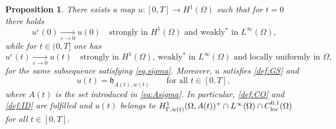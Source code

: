 \documentclass[a4paper,11pt,reqno]{amsart}
\numberwithin{equation}{section}
\newtheorem{prop}[teo]{Proposition}
\theoremstyle{definition}
\theoremstyle{remark}
\begin{document}
\begin{prop}\label{teo:convergence_ueps}
    There exists a map $u\colon[0,T]\to H^1(\Omega)$ such that for $t=0$ there holds
     \begin{equation}\label{eq:convergenceeps0}
        u^{\varepsilon}(0) \xrightarrow[\varepsilon\to 0]{} u(0) \quad \text{strongly in $H^1(\Omega)$ and weakly$^*$ in $L^\infty(\Omega)$,}
    \end{equation}
    while for $t\in (0,T]$ one has
    \begin{equation}\label{eq:convergenceeps}
        u^{\varepsilon}(t) \xrightarrow[\varepsilon\to 0]{} u(t) \quad \text{strongly in $H^1(\Omega)$, weakly$^*$ in $L^\infty(\Omega)$ and locally uniformly in $\Omega$,}
    \end{equation} 
    for the same subsequence satisfying \eqref{eq.sigma}. Moreover, $u$ satisfies \ref{def:GS} and
    \begin{equation}\label{eq:u=uAeps}
        u(t)=\mathfrak{h}_{A(t),w(t)}\qquad\text{for all }t\in [0,T],
    \end{equation}
    where $A(t)$ is the set introduced in \eqref{eq:Asigma}. In particular, \ref{def:CO} and \ref{def:ID} are fulfilled and $u(t)$ belongs to $H^1_{\Gamma,w(t)}(\Omega, A(t))^+\cap L^\infty(\Omega)\cap C^{0,1}_{\rm loc}(\Omega)$ for all $t\in [0,T]$. 
\end{prop}
\end{document}
